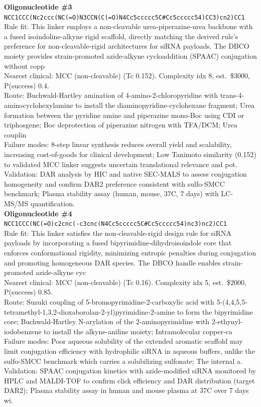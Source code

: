 \documentclass[10pt]{article}
\begin{document}
\noindent\textbf{Oligonucleotide \#3} \\ \texttt{NCC1CCC(Nc2ccc(NC(=O)N3CCN(C(=O)N4Cc5ccccc5C\#Cc5ccccc54)CC3)cn2)CC1} \\ Rule fit: This linker employs a non-cleavable urea-piperazine-urea backbone with a fused isoindoline-alkyne rigid scaffold, directly matching the derived rule's preference for non-cleavable-rigid architectures for siRNA payloads. The DBCO moiety provides strain-promoted azide-alkyne cycloaddition (SPAAC) conjugation without copp \\ Nearest clinical: MCC (non-cleavable) (Tc 0.152). Complexity idx 8, est.\ \$3000, P(success) 0.4. \\ Route: Buchwald-Hartley amination of 4-amino-2-chloropyridine with trans-4-aminocyclohexylamine to install the diaminopyridine-cyclohexane fragment; Urea formation between the pyridine amine and piperazine mono-Boc using CDI or triphosgene; Boc deprotection of piperazine nitrogen with TFA/DCM; Urea couplin \\ Failure modes: 8-step linear synthesis reduces overall yield and scalability, increasing cost-of-goods for clinical development; Low Tanimoto similarity (0.152) to validated MCC linker suggests uncertain translational relevance and pot. Validation: DAR analysis by HIC and native SEC-MALS to assess conjugation homogeneity and confirm DAR2 preference consistent with sulfo-SMCC benchmark; Plasma stability assay (human, mouse, 37\textdegree{}C, 7 days) with LC-MS/MS quantification. \\[0.4em]
\noindent\textbf{Oligonucleotide \#4} \\ \texttt{NCC1CCC(NC(=O)c2cnc(-c3cnc(N4Cc5ccccc5C\#Cc5ccccc54)nc3)nc2)CC1} \\ Rule fit: This linker satisfies the non-cleavable-rigid design rule for siRNA payloads by incorporating a fused bipyrimidine-dihydroisoindole core that enforces conformational rigidity, minimizing entropic penalties during conjugation and promoting homogeneous DAR species. The DBCO handle enables strain-promoted azide-alkyne cyc \\ Nearest clinical: MCC (non-cleavable) (Tc 0.16). Complexity idx 5, est.\ \$2000, P(success) 0.85. \\ Route: Suzuki coupling of 5-bromopyrimidine-2-carboxylic acid with 5-(4,4,5,5-tetramethyl-1,3,2-dioxaborolan-2-yl)pyrimidine-2-amine to form the bipyrimidine core; Buchwald-Hartley N-arylation of the 2-aminopyrimidine with 2-ethynyl-iodobenzene to install the alkyne-aniline moiety; Intramolecular copper-ca \\ Failure modes: Poor aqueous solubility of the extended aromatic scaffold may limit conjugation efficiency with hydrophilic siRNA in aqueous buffers, unlike the sulfo-SMCC benchmark which carries a solubilizing sulfonate; The internal a. Validation: SPAAC conjugation kinetics with azide-modified siRNA monitored by HPLC and MALDI-TOF to confirm click efficiency and DAR distribution (target DAR2); Plasma stability assay in human and mouse plasma at 37\textdegree{}C over 7 days wi. \\[0.4em]
\end{document}
